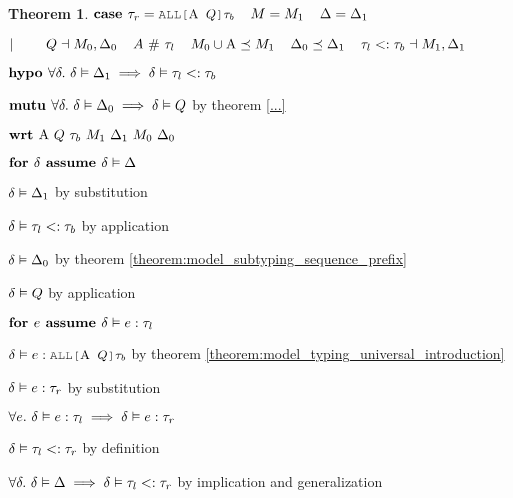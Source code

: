 \documentclass[acmsmall]{acmart}
\theoremstyle{definition}
\newtheorem{theorem}{Theorem}[section]
\begin{document}
\begin{theorem}
    \item \Z $\B{case } 
      \tau_r = \J{ALL[$\Alpha$ $Q$]$\tau_b$}
      \I
      M = M_1
      \I
      \Delta = \Delta_1
    $
    \item \Z $|\ \ \ \ \ \ \ 
      Q \dashv M_0, \Delta_0
      \hspace{4mm}
      A \ \#\  \tau_l
      \hspace{4mm}
      M_0 \cup \mathrm{A} \preceq M_1
      \hspace{4mm}
      \Delta_0 \preceq \Delta_1
      \hspace{4mm}
      \tau_l <: \tau_b
      \dashv M_1, \Delta_1
    $
    \item \Z $\textbf{hypo } 
      \forall \delta .\ \delta \vDash \Delta_1 \implies \delta \vDash \tau_l <: \tau_b 
    $
    \item \Z $\textbf{mutu } 
      \forall \delta .\ \delta \vDash \Delta_0 \implies \delta \vDash Q 
    $ by theorem \ref{...} 
    \item \Z $\B{wrt } \Alpha\ Q\ \tau_b\ M_1\ \Delta_1\ M_0\ \Delta_0$
      \item \Z\Z $\textbf{for } \delta \textbf{ assume } \delta \vDash \Delta$
        \item \Z\Z\Z $\delta \vDash \Delta_1$ by substitution 
        \item \Z\Z\Z $\delta \vDash \tau_l <: \tau_b$ by application 
        \item \Z\Z\Z $\delta \vDash \Delta_0$ by theorem \ref{theorem:model_subtyping_sequence_prefix} 
        \item \Z\Z\Z $\delta \vDash Q$ by application 
        \item \Z\Z\Z $\textbf{for } e \textbf{ assume } \delta \vDash e : \tau_l$ 
          \item \Z\Z\Z\Z $\delta \satisfies e \hastype \J{ALL[$\Alpha$ $Q$]$\tau_b$}$ by theorem \ref{theorem:model_typing_universal_introduction} 
          \item \Z\Z\Z\Z $\delta \vDash e : \tau_r$ by substitution 
        \item \Z\Z\Z $\forall e .\ \delta \vDash e : \tau_l 
          \implies \delta \vDash e : \tau_r
        $ 
        \item \Z\Z\Z $\delta \vDash \tau_l <: \tau_r$ by definition 
      \item \Z\Z $\forall \delta .\ \delta \vDash \Delta \implies \delta \vDash \tau_l <: \tau_r$ 
      by implication and generalization
      \item \Z\Z {} 


\end{theorem}
\end{document}
